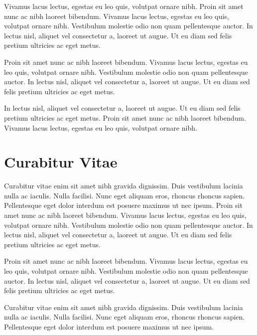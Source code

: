 Vivamus lacus lectus, egestas eu leo quis, volutpat ornare nibh. Proin sit amet nunc ac nibh laoreet bibendum. Vivamus lacus lectus, egestas eu leo quis, volutpat ornare nibh. Vestibulum molestie odio non quam pellentesque auctor. In lectus nisl, aliquet vel consectetur a, laoreet ut augue. Ut eu diam sed felis pretium ultricies ac eget metus.


\begin{corollary}
Proin sit amet nunc ac nibh laoreet bibendum. Vivamus lacus lectus, egestas eu leo quis, volutpat ornare nibh. Vestibulum molestie odio non quam pellentesque auctor. In lectus nisl, aliquet vel consectetur a, laoreet ut augue. Ut eu diam sed felis pretium ultricies ac eget metus.	
\end{corollary}

\begin{corollary}
In lectus nisl, aliquet vel consectetur a, laoreet ut augue. Ut eu diam sed felis pretium ultricies ac eget metus. Proin sit amet nunc ac nibh laoreet bibendum. Vivamus lacus lectus, egestas eu leo quis, volutpat ornare nibh.	
\end{corollary}

\section{Curabitur Vitae}

Curabitur vitae enim sit amet nibh gravida dignissim. Duis vestibulum lacinia nulla ac iaculis. Nulla facilisi. Nunc eget aliquam eros, rhoncus rhoncus sapien. Pellentesque eget dolor interdum est posuere maximus ut nec ipsum. Proin sit amet nunc ac nibh laoreet bibendum. Vivamus lacus lectus, egestas eu leo quis, volutpat ornare nibh. Vestibulum molestie odio non quam pellentesque auctor. In lectus nisl, aliquet vel consectetur a, laoreet ut augue. Ut eu diam sed felis pretium ultricies ac eget metus.

Proin sit amet nunc ac nibh laoreet bibendum. Vivamus lacus lectus, egestas eu leo quis, volutpat ornare nibh. Vestibulum molestie odio non quam pellentesque auctor. In lectus nisl, aliquet vel consectetur a, laoreet ut augue. Ut eu diam sed felis pretium ultricies ac eget metus.

\begin{lemma}
Curabitur vitae enim sit amet nibh gravida dignissim. Duis vestibulum lacinia nulla ac iaculis. Nulla facilisi. Nunc eget aliquam eros, rhoncus rhoncus sapien. Pellentesque eget dolor interdum est posuere maximus ut nec ipsum.
\end{lemma}

